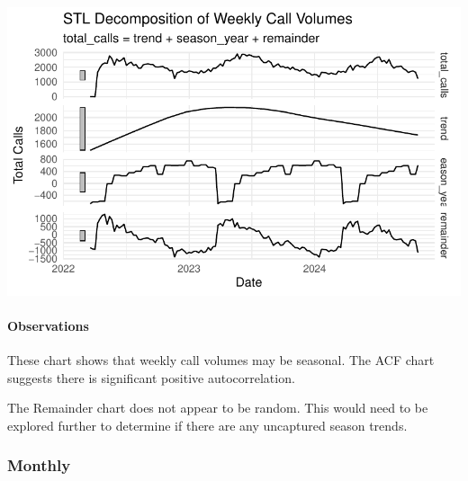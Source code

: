 \documentclass[
  letterpaper,
  DIV=11,
  numbers=noendperiod]{scrartcl}
\let\oldparagraph\paragraph
\renewcommand{\paragraph}[1]{\oldparagraph{#1}\mbox{}}
\begin{document}
\includegraphics{final_proj_group1_files/figure-pdf/weekly-3.pdf}

\paragraph{Observations}\label{observations-6}

These chart shows that weekly call volumes may be seasonal. The ACF
chart suggests there is significant positive autocorrelation.

The Remainder chart does not appear to be random. This would need to be
explored further to determine if there are any uncaptured season trends.

\subsubsection{Monthly}\label{monthly}
\end{document}
